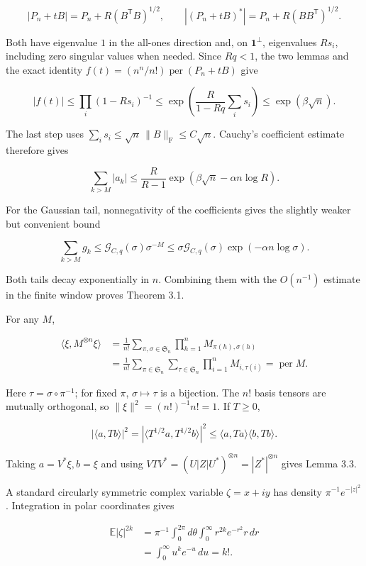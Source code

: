\documentclass[11pt,a4paper]{article}
\begin{document}
\[
|P_n+tB|=P_n+R(B^{\mathsf T}B)^{1/2},
\qquad
|(P_n+tB)^*|=P_n+R(BB^{\mathsf T})^{1/2}.
\]

Both have eigenvalue \(1\) in the all-ones direction and, on \(\mathbf1^\perp\), eigenvalues \(Rs_i\), including zero singular values when needed. Since \(Rq<1\), the two lemmas and the exact identity \(f(t)=(n^n/n!)\operatorname{per}(P_n+tB)\) give

\[
|f(t)|\le\prod_i(1-Rs_i)^{-1}
\le\exp\!\left(\frac{R}{1-Rq}\sum_i s_i\right)
\le\exp(\beta\sqrt n).
\]

The last step uses \(\sum_i s_i\le\sqrt n\,\|B\|_{\mathrm F}\le C\sqrt n\). Cauchy's coefficient estimate therefore gives

\[
\sum_{k>M}|a_k|
\le\frac{R}{R-1}
\exp\!\left(\beta\sqrt n-\alpha n\log R\right).
\]

For the Gaussian tail, nonnegativity of the coefficients gives the slightly weaker but convenient bound

\[
\sum_{k>M}g_k
\le \mathcal G_{C,q}(\sigma)\sigma^{-M}
\le\sigma\mathcal G_{C,q}(\sigma)\exp\!\left(-\alpha n\log\sigma\right).
\]

Both tails decay exponentially in \(n\). Combining them with the \(O(n^{-1})\) estimate in the finite window proves Theorem 3.1.

For any \(M\),

\[
\begin{aligned}
\langle\xi,M^{\otimes n}\xi\rangle
&=\frac1{n!}\sum_{\pi,\sigma\in \mathfrak S_n}\prod_{h=1}^nM_{\pi(h),\sigma(h)}\\
&=\frac1{n!}\sum_{\pi\in \mathfrak S_n}\sum_{\tau\in \mathfrak S_n}\prod_{i=1}^nM_{i,\tau(i)}
=\operatorname{per}M.
\end{aligned}
\]

Here \(\tau=\sigma\circ\pi^{-1}\); for fixed \(\pi\), \(\sigma\mapsto\tau\) is a bijection. The \(n!\) basis tensors are mutually orthogonal, so \(\|\xi\|^2=(n!)^{-1}n!=1\). If \(T\ge0\),

\[
|\langle a,Tb\rangle|^2
=|\langle T^{1/2}a,T^{1/2}b\rangle|^2
\le\langle a,Ta\rangle\langle b,Tb\rangle.
\]

Taking \(a=V^*\xi,b=\xi\) and using \(VTV^*=(U|Z|U^*)^{\otimes n}=|Z^*|^{\otimes n}\) gives Lemma 3.3.

A standard circularly symmetric complex variable \(\zeta=x+iy\) has density \(\pi^{-1}e^{-|z|^2}\). Integration in polar coordinates gives

\[
\begin{aligned}
\mathbb E|\zeta|^{2k}
&=\pi^{-1}\int_0^{2\pi}\!d\theta\int_0^{\infty}r^{2k}e^{-r^2}r\,dr\\
&=\int_0^{\infty}u^ke^{-u}\,du=k!.
\end{aligned}
\]
\end{document}

